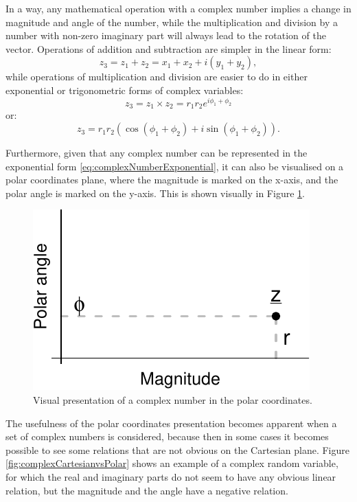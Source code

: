 \documentclass[
]{book}
\begin{document}
In a way, any mathematical operation with a complex number implies a change in magnitude and angle of the number, while the multiplication and division by a number with non-zero imaginary part will always lead to the rotation of the vector. Operations of addition and subtraction are simpler in the linear form:
\begin{equation*}
    z_3 = z_1 + z_2 = x_1 + x_2 + i (y_1 + y_2) ,
\end{equation*}
while operations of multiplication and division are easier to do in either exponential or trigonometric forms of complex variables:
\begin{equation*}
    z_3 = z_1 \times z_2 = r_1 r_2 e^{i \phi_1 + \phi_2} 
\end{equation*}
or:
\begin{equation*}
    z_3 = r_1 r_2 \left(\cos (\phi_1 + \phi_2) + i \sin (\phi_1 + \phi_2) \right) .
\end{equation*}

Furthermore, given that any complex number can be represented in the exponential form \eqref{eq:complexNumberExponential}, it can also be visualised on a polar coordinates plane, where the magnitude is marked on the x-axis, and the polar angle is marked on the y-axis. This is shown visually in Figure \ref{fig:complexPlanePolar}.

\begin{figure}
\centering
\includegraphics{Svetunkov---Svetunkov---Complex-Dynamic-Models_files/figure-latex/complexPlanePolar-1.pdf}
\caption{\label{fig:complexPlanePolar}Visual presentation of a complex number in the polar coordinates.}
\end{figure}

The usefulness of the polar coordinates presentation becomes apparent when a set of complex numbers is considered, because then in some cases it becomes possible to see some relations that are not obvious on the Cartesian plane. Figure \ref{fig:complexCartesianvsPolar} shows an example of a complex random variable, for which the real and imaginary parts do not seem to have any obvious linear relation, but the magnitude and the angle have a negative relation.
\end{document}
